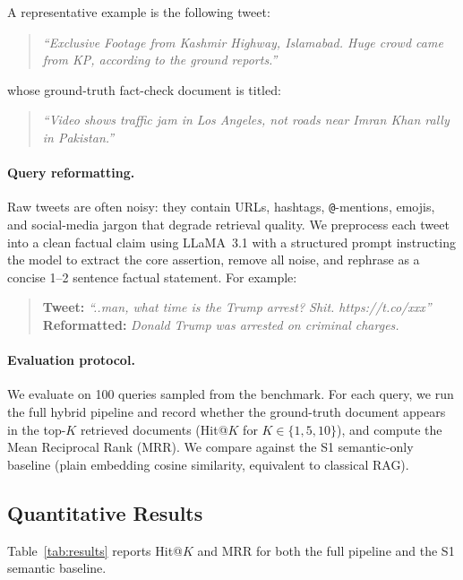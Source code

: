 \documentclass[10pt]{article}
\begin{document}
A representative example is the following tweet:

\begin{quote}
\small
\textit{``Exclusive Footage from Kashmir Highway, Islamabad. Huge crowd came from KP, according to the ground reports.''}
\end{quote}

whose ground-truth fact-check document is titled:

\begin{quote}
\small
\textit{``Video shows traffic jam in Los Angeles, not roads near Imran Khan rally in Pakistan.''}
\end{quote}

\paragraph{Query reformatting.} Raw tweets are often noisy: they contain URLs, hashtags, \texttt{@}-mentions, emojis, and social-media jargon that degrade retrieval quality. We preprocess each tweet into a clean factual claim using LLaMA~3.1 with a structured prompt instructing the model to extract the core assertion, remove all noise, and rephrase as a concise 1--2 sentence factual statement. For example:

\begin{quote}
\small
\textbf{Tweet:} \textit{``..man, what time is the Trump arrest? Shit. https://t.co/xxx''}\\
\textbf{Reformatted:} \textit{Donald Trump was arrested on criminal charges.}
\end{quote}

\paragraph{Evaluation protocol.} We evaluate on 100 queries sampled from the benchmark. For each query, we run the full hybrid pipeline and record whether the ground-truth document appears in the top-$K$ retrieved documents (Hit@$K$ for $K \in \{1, 5, 10\}$), and compute the Mean Reciprocal Rank (MRR). We compare against the S1 semantic-only baseline (plain embedding cosine similarity, equivalent to classical RAG).

\subsection{Quantitative Results}

Table~\ref{tab:results} reports Hit@$K$ and MRR for both the full pipeline and the S1 semantic baseline.
\end{document}
